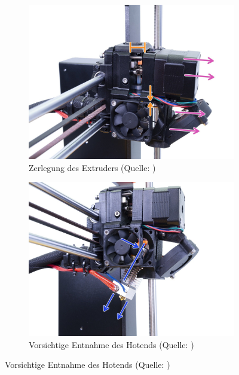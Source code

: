 \begin{itemize}
\begin{figure}[h]
      \end{figure}
      \begin{figure}[h]
        \centering
        \begin{subfigure}[b]{0.45\textwidth}
          \includegraphics[width=0.8\linewidth]{bilder/Anleitung - Zerlegen1.jpg}
          \caption[Anleitung: Zerlegung des Extruders] {Zerlegung des Extruders (Quelle: \autocite{Prusa})}
        \label{Zerlegen1}
        \end{subfigure}
        \hfill
        \begin{subfigure}[b]{0.45\textwidth}
          \includegraphics[width=\textwidth]{bilder/Anleitung - Zerlegen2.jpg}
          \caption[Anleitung: Vorsichtige Entnahme des Hotends] {Vorsichtige Entnahme des Hotends (Quelle: \autocite{Prusa})}
          \label{Zerlegen2}
        \end{subfigure}
      \end{figure}
      \FloatBarrier


\end{itemize}
